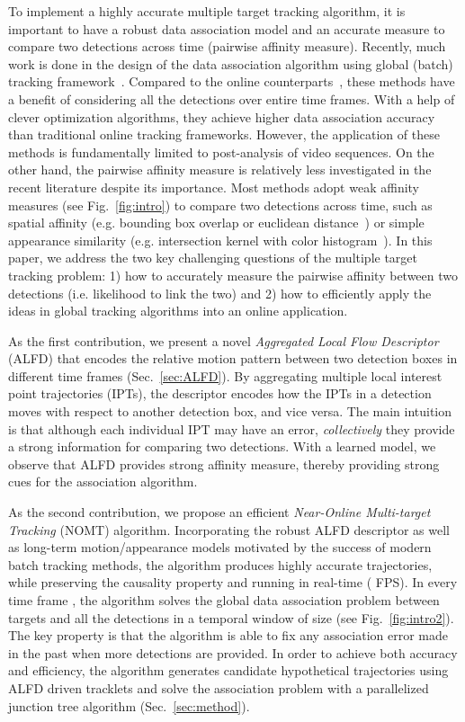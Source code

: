 \documentclass[10pt,twocolumn,letterpaper]{article}
\begin{document}
To implement a highly accurate multiple target tracking algorithm, it is important to have a robust data association model and an accurate measure to compare two detections across time (pairwise affinity measure). Recently, much work is done in the design of the data association algorithm using global (batch) tracking framework~\cite{BerclazFTF11,Kuo_CVPR_10,Milan:2014:CEM,Zhang_CVPR_08}. 
Compared to the online counterparts~\cite{BreitensteinICCV09,choi_pami13,Ess_PAMI_09,Khan_PAMI_05}, these methods have a benefit of considering all the detections over entire time frames. With a help of clever optimization algorithms, they achieve higher data association accuracy than traditional online tracking frameworks. However, the application of these methods is fundamentally limited to post-analysis of video sequences. 
On the other hand, the pairwise affinity measure is relatively less investigated in the recent literature despite its importance. Most methods adopt weak affinity measures (see Fig.~\ref{fig:intro}) to compare two detections across time, such as spatial affinity (e.g. bounding box overlap or euclidean distance~\cite{Andriyenko:2012:DCO,BerclazFTF11,Pirsiavash_CVPR_11}) or simple appearance similarity (e.g. intersection kernel with color histogram~\cite{ZamirECCV12}). In this paper, we address the two key challenging questions of the multiple target tracking problem: 1) how to accurately measure the pairwise affinity between two detections (i.e. likelihood to link the two) and 2) how to efficiently apply the ideas in global tracking algorithms into an online application. 

As the first contribution, we present a novel \emph{Aggregated Local Flow Descriptor} (ALFD) that encodes the relative motion pattern between two detection boxes in different time frames (Sec.~\ref{sec:ALFD}). By aggregating multiple local interest point trajectories (IPTs), the descriptor encodes how the IPTs in a detection moves with respect to another detection box, and vice versa. The main intuition is that although each individual IPT may have an error, \emph{collectively} they provide a strong information for comparing two detections. With a learned model, we observe that ALFD provides strong affinity measure, thereby providing strong cues for the association algorithm. 
 
As the second contribution, we propose an efficient \emph{Near-Online Multi-target Tracking} (NOMT) algorithm. Incorporating the robust ALFD descriptor as well as long-term motion/appearance models motivated by the success of modern batch tracking methods, the algorithm produces highly accurate trajectories, while preserving the causality property and running in real-time ( FPS). In every time frame , the algorithm solves the global data association problem between targets and all the detections in a temporal window  of size  (see Fig.~\ref{fig:intro2}). The key property is that the algorithm is able to fix any association error made in the past when more detections are provided. In order to achieve both accuracy and efficiency, the algorithm generates candidate hypothetical trajectories using ALFD driven tracklets and solve the association problem with a parallelized junction tree algorithm (Sec.~\ref{sec:method}). 
\end{document}

